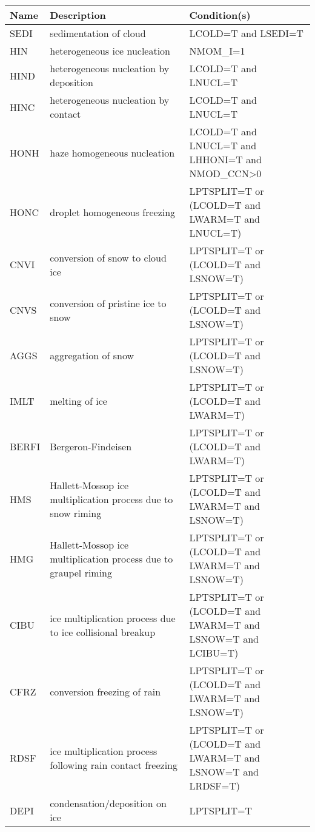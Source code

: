 \begin{longtable} {|p{}|p{}|p{}|}
\hline
Name & Description & Condition(s) \\
\hline \hline
\endhead
SEDI   & sedimentation of cloud                         & LCOLD=T and LSEDI=T \\\hline
HIN    & heterogeneous ice nucleation                   & NMOM\_I=1 \\\hline
HIND   & heterogeneous nucleation by deposition         & LCOLD=T and LNUCL=T \\\hline
HINC   & heterogeneous nucleation by contact            & LCOLD=T and LNUCL=T \\\hline
HONH   & haze homogeneous nucleation                    & LCOLD=T and LNUCL=T and LHHONI=T and NMOD\_CCN>0 \\\hline
HONC   & droplet homogeneous freezing                   & LPTSPLIT=T or (LCOLD=T and LWARM=T and LNUCL=T) \\\hline
CNVI   & conversion of snow to cloud ice                & LPTSPLIT=T or (LCOLD=T and LSNOW=T) \\\hline
CNVS   & conversion of pristine ice to snow             & LPTSPLIT=T or (LCOLD=T and LSNOW=T) \\\hline
AGGS   & aggregation of snow                            & LPTSPLIT=T or (LCOLD=T and LSNOW=T) \\\hline
IMLT   & melting of ice                                 & LPTSPLIT=T or (LCOLD=T and LWARM=T) \\\hline
BERFI  & Bergeron-Findeisen                             & LPTSPLIT=T or (LCOLD=T and LWARM=T) \\\hline
HMS    & Hallett-Mossop ice multiplication process due to snow riming    & LPTSPLIT=T or (LCOLD=T and LWARM=T and LSNOW=T) \\\hline
HMG    & Hallett-Mossop ice multiplication process due to graupel riming & LPTSPLIT=T or (LCOLD=T and LWARM=T and LSNOW=T) \\\hline
CIBU   & ice multiplication process due to ice collisional breakup & LPTSPLIT=T or (LCOLD=T and LWARM=T and LSNOW=T and LCIBU=T) \\\hline
CFRZ   & conversion freezing of rain                    & LPTSPLIT=T or (LCOLD=T and LWARM=T and LSNOW=T) \\\hline
RDSF   & ice multiplication process following rain contact freezing & LPTSPLIT=T or (LCOLD=T and LWARM=T and LSNOW=T and LRDSF=T) \\\hline
DEPI   & condensation/deposition on ice                 & LPTSPLIT=T \\\hline

\end{longtable}
